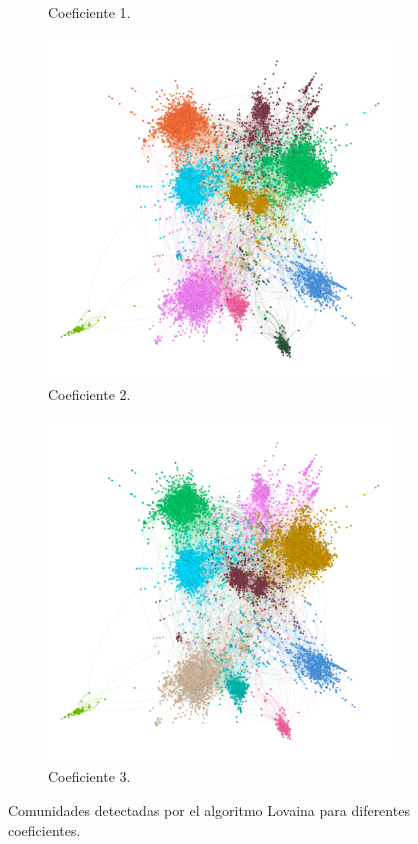 \begin{figure}
\begin{subfigure}[t]{0.48\textwidth}
      \caption{Coeficiente 1.}
    \end{subfigure}
    \hfill
    \begin{subfigure}[t]{0.48\textwidth}
      \centering
      \includegraphics[width=\textwidth]{img/resultados/grado-lovaina2.png}
      \caption{Coeficiente 2.}
    \end{subfigure}
    \hfill
    \begin{subfigure}[t]{0.48\textwidth}
      \centering
      \includegraphics[width=\textwidth]{img/resultados/grado-lovaina3.png}
      \caption{Coeficiente 3.}
    \end{subfigure}
  
    \caption{Comunidades detectadas por el algoritmo Lovaina para diferentes coeficientes.}
\end{figure}

